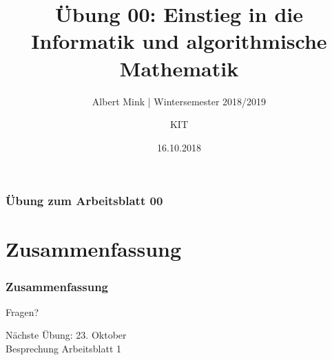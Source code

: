 \documentclass[c,18pt]{beamer}
\date{16.10.2018}
\title[Übung 00: Einstieg in die Informatik und algorithmische Mathematik]
  {Übung 00: Einstieg in die Informatik und algorithmische Mathematik}
\subtitle{Albert Mink | Wintersemester 2018/2019}
\author[Albert Mink, ]{KIT}
\institute[Institut für Angewandte und Numerische Mathematik (IANM)]{Institut für Angewandte und Numerische Mathematik}
\begin{document}
\begin{frame}
  \maketitle
\end{frame}

\begin{frame}
  \frametitle{Übung zum Arbeitsblatt 00}%
\tableofcontents[hideallsubsections]
\end{frame}

\def\kap{1}%
\def\kap{2}%
\def\kap{3}%
\def\kap{4}%

\def\kap{5}%
\def\kap{6}%


\section{Zusammenfassung}
\begin{frame}
  \frametitle{Zusammenfassung}%
\tableofcontents[hideallsubsections]
\end{frame}

\begin{frame}
\centering
\Huge\textcolor{KITgreen}{Fragen?}
\vspace{2cm}

{\LARGE
Nächste Übung: 23. Oktober\\
Besprechung Arbeitsblatt 1
}
\end{frame}


\end{document}
